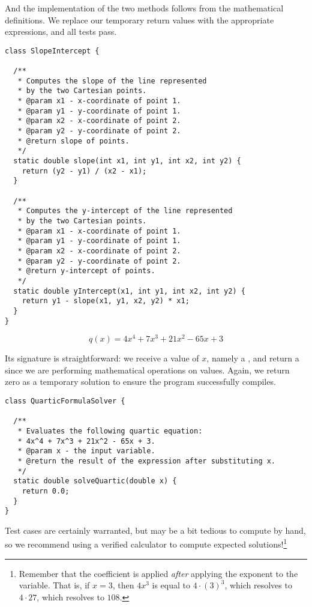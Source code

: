 And the implementation of the two methods follows from the mathematical definitions. We replace our temporary  return values with the appropriate expressions, and all tests pass.

\begin{lstlisting}[language=MyJava]
class SlopeIntercept {

  /**
   * Computes the slope of the line represented 
   * by the two Cartesian points.
   * @param x1 - x-coordinate of point 1.
   * @param y1 - y-coordinate of point 1.
   * @param x2 - x-coordinate of point 2.
   * @param y2 - y-coordinate of point 2.
   * @return slope of points.
   */
  static double slope(int x1, int y1, int x2, int y2) {
    return (y2 - y1) / (x2 - x1);
  }

  /**
   * Computes the y-intercept of the line represented 
   * by the two Cartesian points.
   * @param x1 - x-coordinate of point 1.
   * @param y1 - y-coordinate of point 1.
   * @param x2 - x-coordinate of point 2.
   * @param y2 - y-coordinate of point 2.
   * @return y-intercept of points.
   */
  static double yIntercept(x1, int y1, int x2, int y2) {
    return y1 - slope(x1, y1, x2, y2) * x1;
  }
}
\end{lstlisting}


\[
q(x) = 4x^4 + 7x^3 + 21x^2 - 65x + 3
\]

Its signature is straightforward: we receive a value of $x$, namely a , and return a  since we are performing mathematical operations on  values. Again, we return zero as a temporary solution to ensure the program successfully compiles.

\begin{lstlisting}[language=MyJava]
class QuarticFormulaSolver {

  /**
   * Evaluates the following quartic equation:
   * 4x^4 + 7x^3 + 21x^2 - 65x + 3.
   * @param x - the input variable.
   * @return the result of the expression after substituting x.
   */
  static double solveQuartic(double x) {
    return 0.0;
  }
}
\end{lstlisting}

Test cases are certainly warranted, but may be a bit tedious to compute by hand, so we recommend using a verified calculator to compute expected solutions!\footnote{Remember that the coefficient is applied \emph{after} applying the exponent to the variable. That is, if $x=3$, then $4x^3$ is equal to $4 \cdot (3)^3$, which resolves to $4 \cdot 27$, which resolves to $108$.}

